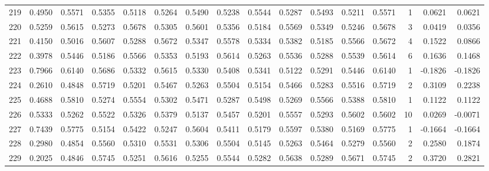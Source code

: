 \begin{tabular}{lrrrrrrrrrrrrrrr}
219 &      0.4950 &  0.5571 &  0.5355 &  0.5118 &  0.5264 &  0.5490 &  0.5238 &  0.5544 &  0.5287 &  0.5493 &   0.5211 &     0.5571 &      1 &                    0.0621 &                     0.0621 \\
220 &      0.5259 &  0.5615 &  0.5273 &  0.5678 &  0.5305 &  0.5601 &  0.5356 &  0.5184 &  0.5569 &  0.5349 &   0.5246 &     0.5678 &      3 &                    0.0419 &                     0.0356 \\
221 &      0.4150 &  0.5016 &  0.5607 &  0.5288 &  0.5672 &  0.5347 &  0.5578 &  0.5334 &  0.5382 &  0.5185 &   0.5566 &     0.5672 &      4 &                    0.1522 &                     0.0866 \\
222 &      0.3978 &  0.5446 &  0.5186 &  0.5566 &  0.5353 &  0.5193 &  0.5614 &  0.5263 &  0.5536 &  0.5288 &   0.5539 &     0.5614 &      6 &                    0.1636 &                     0.1468 \\
223 &      0.7966 &  0.6140 &  0.5686 &  0.5332 &  0.5615 &  0.5330 &  0.5408 &  0.5341 &  0.5122 &  0.5291 &   0.5446 &     0.6140 &      1 &                   -0.1826 &                    -0.1826 \\
224 &      0.2610 &  0.4848 &  0.5719 &  0.5201 &  0.5467 &  0.5263 &  0.5504 &  0.5154 &  0.5466 &  0.5283 &   0.5516 &     0.5719 &      2 &                    0.3109 &                     0.2238 \\
225 &      0.4688 &  0.5810 &  0.5274 &  0.5554 &  0.5302 &  0.5471 &  0.5287 &  0.5498 &  0.5269 &  0.5566 &   0.5388 &     0.5810 &      1 &                    0.1122 &                     0.1122 \\
226 &      0.5333 &  0.5262 &  0.5522 &  0.5326 &  0.5379 &  0.5137 &  0.5457 &  0.5201 &  0.5557 &  0.5293 &   0.5602 &     0.5602 &     10 &                    0.0269 &                    -0.0071 \\
227 &      0.7439 &  0.5775 &  0.5154 &  0.5422 &  0.5247 &  0.5604 &  0.5411 &  0.5179 &  0.5597 &  0.5380 &   0.5169 &     0.5775 &      1 &                   -0.1664 &                    -0.1664 \\
228 &      0.2980 &  0.4854 &  0.5560 &  0.5310 &  0.5531 &  0.5306 &  0.5504 &  0.5145 &  0.5263 &  0.5464 &   0.5279 &     0.5560 &      2 &                    0.2580 &                     0.1874 \\
229 &      0.2025 &  0.4846 &  0.5745 &  0.5251 &  0.5616 &  0.5255 &  0.5544 &  0.5282 &  0.5638 &  0.5289 &   0.5671 &     0.5745 &      2 &                    0.3720 &                     0.2821 \\

\end{tabular}
